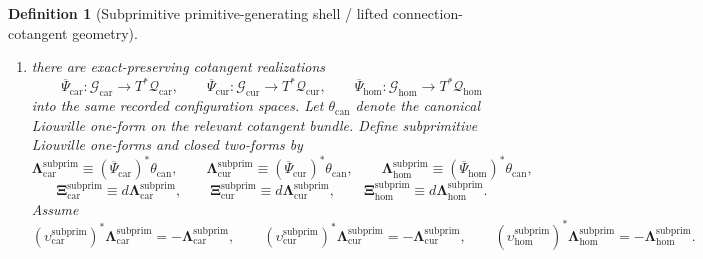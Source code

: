 \documentclass[11pt]{article}
\newcommand{\TensorConstraintTarget}{\mathcal K_{\mathrm{car}}}
\newcommand{\CurConstraintTarget}{\mathcal K_{\mathrm{cur}}}
\newcommand{\HomConstraintTarget}{\mathcal K_{\mathrm{hom}}}
\newcommand{\TensorConfigSpace}{\mathcal Q_{\mathrm{car}}}
\newcommand{\CurConfigSpace}{\mathcal Q_{\mathrm{cur}}}
\newcommand{\HomConfigSpace}{\mathcal Q_{\mathrm{hom}}}
\newcommand{\TensorPrimitiveSpace}{\mathcal P_{\mathrm{car}}}
\newcommand{\CurPrimitiveSpace}{\mathcal P_{\mathrm{cur}}}
\newcommand{\HomPrimitiveSpace}{\mathcal P_{\mathrm{hom}}}
\newcommand{\TensorPrimitiveConstraintMap}{\widehat{\mathfrak C}_{\mathrm{car}}^{\mathrm{root}}}
\newcommand{\CurPrimitiveConstraintMap}{\widehat{\mathfrak C}_{\mathrm{cur}}^{\mathrm{root}}}
\newcommand{\HomPrimitiveConstraintMap}{\widehat{\mathfrak C}_{\mathrm{hom}}^{\mathrm{root}}}
\newcommand{\TensorSubprimitiveSpace}{\mathcal G_{\mathrm{car}}}
\newcommand{\CurSubprimitiveSpace}{\mathcal G_{\mathrm{cur}}}
\newcommand{\HomSubprimitiveSpace}{\mathcal G_{\mathrm{hom}}}
\newcommand{\TensorSubprimitiveTimeRev}{\upsilon_{\mathrm{car}}^{\mathrm{subprim}}}
\newcommand{\CurSubprimitiveTimeRev}{\upsilon_{\mathrm{cur}}^{\mathrm{subprim}}}
\newcommand{\HomSubprimitiveTimeRev}{\upsilon_{\mathrm{hom}}^{\mathrm{subprim}}}
\newcommand{\TensorSubprimitiveConstraintMap}{\overline{\mathfrak C}_{\mathrm{car}}^{\mathrm{root}}}
\newcommand{\CurSubprimitiveConstraintMap}{\overline{\mathfrak C}_{\mathrm{cur}}^{\mathrm{root}}}
\newcommand{\HomSubprimitiveConstraintMap}{\overline{\mathfrak C}_{\mathrm{hom}}^{\mathrm{root}}}
\newcommand{\TensorSubprimitiveCotangentRealization}{\overline{\Psi}_{\mathrm{car}}}
\newcommand{\CurSubprimitiveCotangentRealization}{\overline{\Psi}_{\mathrm{cur}}}
\newcommand{\HomSubprimitiveCotangentRealization}{\overline{\Psi}_{\mathrm{hom}}}
\newcommand{\TensorSubprimitiveLiouville}{\boldsymbol{\Lambda}_{\mathrm{car}}^{\mathrm{subprim}}}
\newcommand{\CurSubprimitiveLiouville}{\boldsymbol{\Lambda}_{\mathrm{cur}}^{\mathrm{subprim}}}
\newcommand{\HomSubprimitiveLiouville}{\boldsymbol{\Lambda}_{\mathrm{hom}}^{\mathrm{subprim}}}
\newcommand{\TensorSubprimitiveTwo}{\boldsymbol{\Xi}_{\mathrm{car}}^{\mathrm{subprim}}}
\newcommand{\CurSubprimitiveTwo}{\boldsymbol{\Xi}_{\mathrm{cur}}^{\mathrm{subprim}}}
\newcommand{\HomSubprimitiveTwo}{\boldsymbol{\Xi}_{\mathrm{hom}}^{\mathrm{subprim}}}
\newtheorem{definition}{Definition}
\begin{document}
\begin{definition}[Subprimitive primitive-generating shell / lifted connection-cotangent geometry]
\begin{enumerate}
    \[
    \TensorSubprimitiveConstraintMap:\TensorSubprimitiveSpace\to\TensorConstraintTarget,\qquad
    \CurSubprimitiveConstraintMap:\CurSubprimitiveSpace\to\CurConstraintTarget,\qquad
    \HomSubprimitiveConstraintMap:\HomSubprimitiveSpace\to\HomConstraintTarget
    \]
    preserved by the corresponding subprimitive time reversals and vanishing on the corresponding subprimitive unit sections. Define the recorded primitive lifted exact-constraint maps by restriction:
    \begin{equation}
    \TensorPrimitiveConstraintMap\equiv\TensorSubprimitiveConstraintMap|_{\TensorPrimitiveSpace},\qquad
    \CurPrimitiveConstraintMap\equiv\CurSubprimitiveConstraintMap|_{\CurPrimitiveSpace},\qquad
    \HomPrimitiveConstraintMap\equiv\HomSubprimitiveConstraintMap|_{\HomPrimitiveSpace}.
    \label{eq:primitive_constraint_from_subprimitive}
    \end{equation}
    \item there are exact-preserving cotangent realizations
    \[
    \TensorSubprimitiveCotangentRealization:\TensorSubprimitiveSpace\to T^*\TensorConfigSpace,\qquad
    \CurSubprimitiveCotangentRealization:\CurSubprimitiveSpace\to T^*\CurConfigSpace,\qquad
    \HomSubprimitiveCotangentRealization:\HomSubprimitiveSpace\to T^*\HomConfigSpace
    \]
    into the same recorded configuration spaces. Let \(\theta_{\mathrm{can}}\) denote the canonical Liouville one-form on the relevant cotangent bundle. Define subprimitive Liouville one-forms and closed two-forms by
    \begin{equation}
    \TensorSubprimitiveLiouville\equiv(\TensorSubprimitiveCotangentRealization)^*\theta_{\mathrm{can}},\qquad
    \CurSubprimitiveLiouville\equiv(\CurSubprimitiveCotangentRealization)^*\theta_{\mathrm{can}},\qquad
    \HomSubprimitiveLiouville\equiv(\HomSubprimitiveCotangentRealization)^*\theta_{\mathrm{can}},
    \label{eq:subprimitive_liouville}
    \end{equation}
    \begin{equation}
    \TensorSubprimitiveTwo\equiv d\TensorSubprimitiveLiouville,\qquad
    \CurSubprimitiveTwo\equiv d\CurSubprimitiveLiouville,\qquad
    \HomSubprimitiveTwo\equiv d\HomSubprimitiveLiouville.
    \label{eq:subprimitive_two}
    \end{equation}
    Assume
    \[
    (\TensorSubprimitiveTimeRev)^*\TensorSubprimitiveLiouville=-\TensorSubprimitiveLiouville,\qquad
    (\CurSubprimitiveTimeRev)^*\CurSubprimitiveLiouville=-\CurSubprimitiveLiouville,\qquad
    (\HomSubprimitiveTimeRev)^*\HomSubprimitiveLiouville=-\HomSubprimitiveLiouville.
\]
\end{enumerate}
\end{definition}
\end{document}
